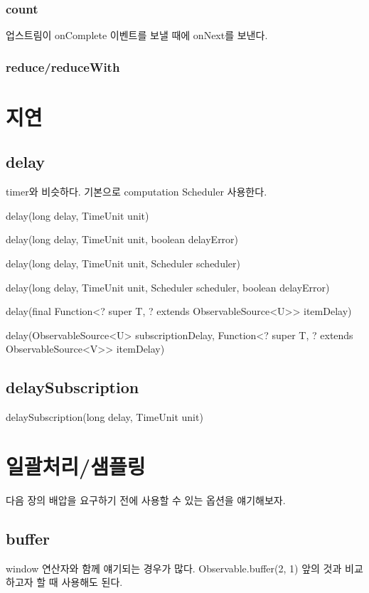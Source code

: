 \documentclass{book}
\begin{document}
{\subsubsection{count}
업스트림이 onComplete 이벤트를 보낼 때에 onNext를 보낸다.

\subsubsection{reduce/reduceWith}

\section{지연}
\subsection{delay}
timer와 비슷하다.
기본으로 computation Scheduler 사용한다.

delay(long delay, TimeUnit unit)

delay(long delay, TimeUnit unit, boolean delayError)

delay(long delay, TimeUnit unit, Scheduler scheduler)

delay(long delay, TimeUnit unit, Scheduler scheduler, boolean delayError)

delay(final Function<? super T, ? extends ObservableSource<U>> itemDelay)

delay(ObservableSource<U> subscriptionDelay,
            Function<? super T, ? extends ObservableSource<V>> itemDelay)

\subsection{delaySubscription}

delaySubscription(long delay, TimeUnit unit)


           
\section{일괄처리/샘플링}
다음 장의 배압을 요구하기 전에 사용할 수 있는 옵션을 얘기해보자.

\subsection{buffer}
window 연산자와 함께 얘기되는 경우가 많다.
Observable.buffer(2, 1)
앞의 것과 비교하고자 할 때 사용해도  된다.

}
\end{document}
